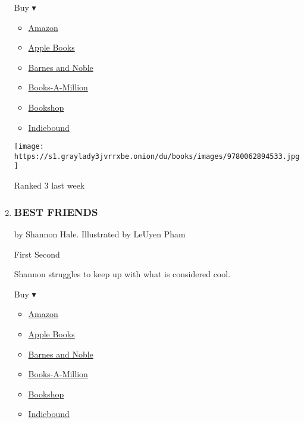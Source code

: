 \begin{enumerate}
  Buy ▾

  \begin{itemize}
  \tightlist
  \item
    \href{https://www.amazon.com/dp/0062894536?tag=NYTBSREV-20\&tag=NYTBS-20}{Amazon}
  \item
    \href{https://du-gae-books-dot-nyt-du-prd.appspot.com/buy?title=BECOMING+BRIANNA\&author=Terri+Libenson}{Apple
    Books}
  \item
    \href{https://www.anrdoezrs.net/click-7990613-11819508?url=https\%3A\%2F\%2Fwww.barnesandnoble.com\%2Fw\%2F\%3Fean\%3D9780062894533}{Barnes
    and Noble}
  \item
    \href{https://www.anrdoezrs.net/click-7990613-35140?url=https\%3A\%2F\%2Fwww.booksamillion.com\%2Fp\%2FBECOMING\%2BBRIANNA\%2FTerri\%2BLibenson\%2F9780062894533}{Books-A-Million}
  \item
    \href{https://bookshop.org/a/3546/9780062894533}{Bookshop}
  \item
    \href{https://www.indiebound.org/book/9780062894533?aff=NYT}{Indiebound}
  \end{itemize}

  \texttt{[image: https://s1.graylady3jvrrxbe.onion/du/books/images/9780062894533.jpg]}

  Ranked 3 last week
\item
  \hypertarget{best-friends}{%
  \subsubsection{BEST FRIENDS}\label{best-friends}}

  by Shannon Hale. Illustrated by LeUyen Pham

  First Second

  Shannon struggles to keep up with what is considered cool.

  Buy ▾

  \begin{itemize}
  \tightlist
  \item
    \href{https://www.amazon.com/Best-Friends-Shannon-Hale/dp/1250317460?tag=NYTBS-20}{Amazon}
  \item
    \href{https://du-gae-books-dot-nyt-du-prd.appspot.com/buy?title=BEST+FRIENDS\&author=Shannon+Hale}{Apple
    Books}
  \item
    \href{https://www.anrdoezrs.net/click-7990613-11819508?url=https\%3A\%2F\%2Fwww.barnesandnoble.com\%2Fw\%2F\%3Fean\%3D9781250317469}{Barnes
    and Noble}
  \item
    \href{https://www.anrdoezrs.net/click-7990613-35140?url=https\%3A\%2F\%2Fwww.booksamillion.com\%2Fp\%2FBEST\%2BFRIENDS\%2FShannon\%2BHale\%2F9781250317469}{Books-A-Million}
  \item
    \href{https://bookshop.org/a/3546/9781250317469}{Bookshop}
  \item
    \href{https://www.indiebound.org/book/9781250317469?aff=NYT}{Indiebound}
  \end{itemize}


\end{enumerate}
